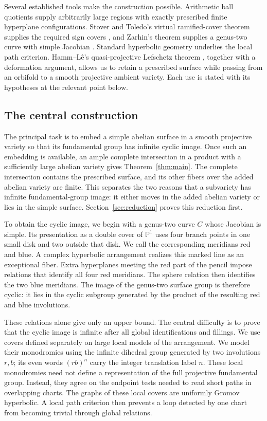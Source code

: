 \documentclass[11pt,reqno]{amsart}
\numberwithin{equation}{section}
\theoremstyle{definition}
\theoremstyle{remark}
\newcommand{\PP}{\mathbb P}
\begin{document}
Several established tools make the construction possible.  Arithmetic
ball quotients supply arbitrarily large regions with exactly prescribed
finite hyperplane configurations.  Stover and Toledo's virtual
ramified-cover theorem supplies the required sign covers
\cite{StoverToledo,LlosaPy}, and Zarhin's theorem supplies a
genus-two curve with simple Jacobian \cite{Zarhin}.  Standard
hyperbolic geometry \cite{BridsonHaefliger} underlies the local path
criterion.  Hamm--L\^e's quasi-projective Lefschetz theorem
\cite{HammLe}, together with a deformation argument, allows us to
retain a prescribed surface while passing
from an orbifold to a smooth projective ambient variety.  Each use is
stated with its hypotheses at the relevant point below.

\subsection{The central construction}
The principal task is to embed a simple abelian surface in a smooth
projective variety so that its fundamental group has infinite cyclic
image.  Once such an embedding is available, an ample complete
intersection in a product with a sufficiently large abelian variety
gives Theorem~\ref{thm:main}.  The complete intersection contains the
prescribed surface, and its other fibers over the added abelian variety
are finite.  This separates the two reasons that a subvariety has
infinite fundamental-group image: it either moves in the added abelian
variety or lies in the simple surface.  Section~\ref{sec:reduction}
proves this reduction first.

To obtain the cyclic image, we begin with a genus-two curve $C$ whose
Jacobian is simple.  Its presentation as a double cover of $\PP^1$
uses four branch points in one small disk and two outside that disk.
We call the corresponding meridians red and blue.  A complex hyperbolic
arrangement realizes this marked line as an exceptional fiber.  Extra
hyperplanes meeting the red part of the pencil impose relations that
identify all four red meridians.  The sphere relation then identifies
the two blue meridians.  The image of the genus-two surface group is
therefore cyclic: it lies in the cyclic subgroup generated by the product
of the resulting red and blue involutions.

These relations alone give only an upper bound.  The central difficulty
is to prove that the cyclic image is infinite after all global
identifications and fillings.  We use covers defined separately on
large local models of the arrangement.  We model their monodromies
using the infinite dihedral group generated by two involutions $r,b$;
its even words $(rb)^n$ carry the integer translation label $n$.
These local monodromies need not
define a representation of the full projective fundamental group.
Instead, they agree on the endpoint tests needed to read short paths
in overlapping charts.  The graphs of these local covers are uniformly
Gromov hyperbolic.  A local path criterion then prevents a loop detected
by one chart from becoming trivial through global relations.
\end{document}
